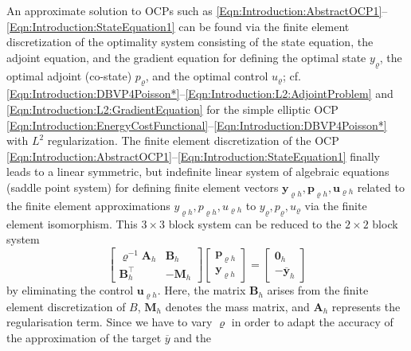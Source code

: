 \documentclass{article}
\numberwithin{equation}{section}
\begin{document}
An approximate  solution to OCPs such as
\eqref{Eqn:Introduction:AbstractOCP1}--\eqref{Eqn:Introduction:StateEquation1}
can be found via the finite element discretization of the optimality system
consisting of the state equation, the adjoint equation, and the gradient
equation for defining the optimal state $y_\varrho$, the optimal adjoint
(co-state) $p_\varrho$, and the optimal control $u_\varrho$; 
cf. \eqref{Eqn:Introduction:DBVP4Poisson*}--\eqref{Eqn:Introduction:L2:AdjointProblem} and \eqref{Eqn:Introduction:L2:GradientEquation}
for the simple elliptic OCP
\eqref{Eqn:Introduction:EnergyCostFunctional}--\eqref{Eqn:Introduction:DBVP4Poisson*} 
with $L^2$ regularization. The finite element discretization of the OCP 
\eqref{Eqn:Introduction:AbstractOCP1}--\eqref{Eqn:Introduction:StateEquation1}
finally leads to a linear symmetric, but indefinite linear system of
algebraic equations (saddle point system) for defining finite element vectors 
$\mathbf{y}_{\varrho h}, \mathbf{p}_{\varrho h}, \mathbf{u}_{\varrho h}$ 
related to the finite element approximations 
$y_{\varrho h}, p_{\varrho h}, u_{\varrho h}$ to $y_\varrho, p_\varrho, u_\varrho$
via the finite element isomorphism. This $3 \times 3$ block system can
be reduced to the $2 \times 2$ block system
        \begin{equation}
        \label{Eqn:Introduction:sid-2x2-block-system}
        \begin{bmatrix}
            \varrho^{-1} \mathbf{A}_h & \mathbf{B}_h\\
            \mathbf{B}^\top_h             & - \mathbf{M}_h
        \end{bmatrix}
        \begin{bmatrix}
            \mathbf{p}_{\varrho h}\\
            \mathbf{y}_{\varrho h}
        \end{bmatrix}
        =
        \begin{bmatrix}
            \mathbf{0}_h\\
            -\mathbf{\overline{y}}_h
        \end{bmatrix}
        \end{equation}
by eliminating the control $\mathbf{u}_{\varrho h}$. Here,
the matrix $\mathbf{B}_h$ arises from the finite element discretization of $B$,
$\mathbf{M}_h$ denotes the mass matrix, and $\mathbf{A}_h$ represents 
the regularisation term. Since we have to vary $\varrho$ in order to adapt
the accuracy of the approximation of the target $\overline{y}$ and the
\end{document}
